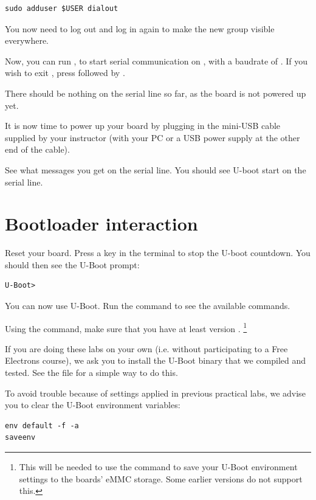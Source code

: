 \begin{verbatim}
sudo adduser $USER dialout
\end{verbatim}

You now need to log out and log in again to make the new group
visible everywhere.

Now, you can run , to start serial
communication on , with a baudrate of . If
you wish to exit , press \code{[Ctrl][a]} followed by
\code{[Ctrl][x]}.

There should be nothing on the serial line so far, as the board is not
powered up yet.

It is now time to power up your board by plugging in the mini-USB
cable supplied by your instructor (with your PC or a USB power supply at the
other end of the cable).

See what messages you get on the serial line. You should see U-boot
start on the serial line.

\section{Bootloader interaction}

Reset your board. Press a key in the  terminal to stop the U-boot
countdown. You should then see the U-Boot prompt:
\begin{verbatim}
U-Boot>
\end{verbatim}

You can now use U-Boot. Run the  command to see the available
commands.

Using the  command, make sure that you have at least version
.
\footnote{This will be needed to use the  command to
save your U-Boot environment settings to the boards' eMMC storage.
Some earlier versions do not support this.}

If you are doing these labs on your own (i.e. without participating to a Free Electrons
course), we ask you to install the U-Boot binary that we compiled and
tested. See the 
file for a simple way to do this.

To avoid trouble because of settings applied in previous practical labs,
we advise you to clear the U-Boot environment variables:

\begin{verbatim}
env default -f -a
saveenv
\end{verbatim}

